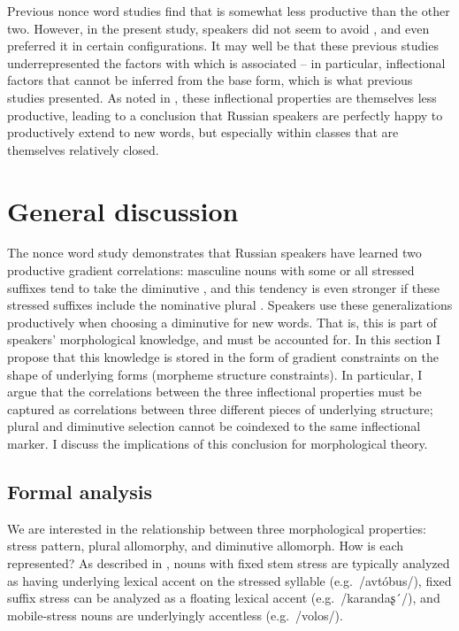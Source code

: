 \documentclass[output=paper,colorlinks,citecolor=brown
]{langscibook}
\begin{document}
Previous nonce word studies \citep{Gouskova.etal2015,Magomedova2017} find that \ok{} is somewhat less productive than the other two. However, in the present study, speakers did not seem to avoid \ok, and even preferred it in certain configurations. It may well be that these previous studies underrepresented the factors with which \ok{} is associated -- in particular, inflectional factors that cannot be inferred from the base form, which is what previous studies presented. As noted in , these inflectional properties are themselves less productive, leading to a conclusion that Russian speakers are perfectly happy to productively extend \ok{} to new words, but especially within classes that are themselves relatively closed.


\section{General discussion}\label{sec:disc}
The nonce word study demonstrates that Russian speakers have learned two productive gradient correlations: masculine nouns with some or all stressed suffixes tend to take the diminutive \ok{}, and this tendency is even stronger if these stressed suffixes include the nominative plural \pla. Speakers use these generalizations productively when choosing a diminutive for new words. That is, this is part of speakers' morphological knowledge, and must be accounted for. In this section I propose that this knowledge is stored in the form of gradient constraints on the shape of underlying forms (morpheme structure constraints). In particular, I argue that the correlations between the three inflectional properties must be captured as correlations between three different pieces of underlying structure; plural and diminutive selection cannot be coindexed to the same inflectional marker. I discuss the implications of this conclusion for morphological theory.

\subsection{Formal analysis}\label{sec:fanal}
We are interested in the relationship between three morphological properties: stress pattern, plural allomorphy, and diminutive allomorph. How is each represented? As described in , nouns with fixed stem stress are typically analyzed as having underlying lexical accent on the stressed syllable (e.g.\ /avtóbus/), fixed suffix stress can be analyzed as a floating lexical accent (e.g.\ /karandaʂ´/), and mobile-stress nouns are underlyingly accentless (e.g.\ /volos/).
\end{document}
